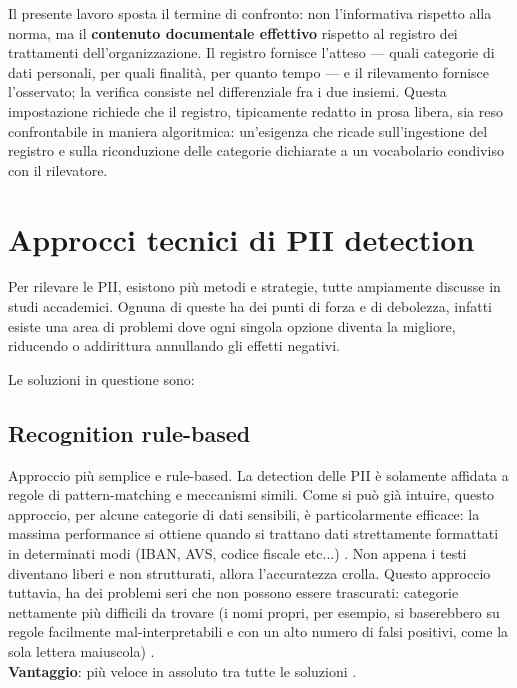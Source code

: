 Il presente lavoro sposta il termine di confronto: non l'informativa rispetto alla norma, ma il \textbf{contenuto documentale effettivo} rispetto al registro dei trattamenti dell'organizzazione. Il registro fornisce l'atteso --- quali categorie di dati personali, per quali finalità, per quanto tempo --- e il rilevamento fornisce l'osservato; la verifica consiste nel differenziale fra i due insiemi. Questa impostazione richiede che il registro, tipicamente redatto in prosa libera, sia reso confrontabile in maniera algoritmica: un'esigenza che ricade sull'ingestione del registro e sulla riconduzione delle categorie dichiarate a un vocabolario condiviso con il rilevatore.

\section{Approcci tecnici di PII detection} %
\label{sec:approcci-PII-detection}
Per rilevare le PII, esistono più metodi e strategie, tutte ampiamente discusse in studi accademici. Ognuna di queste ha dei punti di forza e di debolezza, infatti esiste una area di problemi dove ogni singola opzione diventa la migliore, riducendo o addirittura annullando gli effetti negativi. \medskip

Le soluzioni in questione sono:
\subsection{Recognition rule-based}
\label{sub:rule-based}
Approccio più semplice e rule-based. La detection delle PII è solamente affidata a regole di pattern-matching e meccanismi simili. Come si può già intuire, questo approccio, per alcune categorie di dati sensibili, è particolarmente efficace: la massima performance si ottiene quando si trattano dati strettamente formattati in determinati modi (IBAN, AVS, codice fiscale etc...) \cite{keraghelRecentAdvancesNamed2024}. Non appena i testi diventano liberi e non strutturati, allora l'accuratezza crolla. \cite[Sezione 5.2]{jhaPIIBenchUnifiedMultiSource2026} Questo approccio tuttavia, ha dei problemi seri che non possono essere trascurati: categorie nettamente più difficili da trovare (i nomi propri, per esempio, si baserebbero su regole facilmente mal-interpretabili e con un alto numero di falsi positivi, come la sola lettera maiuscola) \cite{elazarWhatsMyBigData2024}.\\
\textbf{Vantaggio}: più veloce in assoluto tra tutte le soluzioni \cite{koliDecodingComplexityIntelligent2025}.


